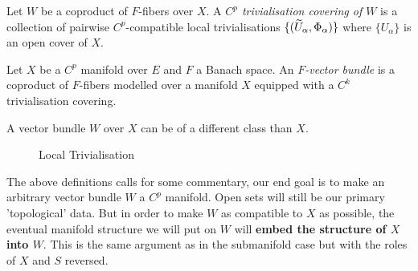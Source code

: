 \documentclass[../main-manifolds.tex]{subfiles}
\begin{document}
%
%
\begin{definition}\label{def:trivialisation-covering}
    Let $W$ be a coproduct of $F$-fibers over $X$. A \emph{$C^p$ trivialisation covering of $W$} is a collection of pairwise $C^p$-compatible local trivialisations $\{(\widetilde{U}_{\alpha},\Phi_{\alpha})\}$ where $\{U_\alpha\}$ is an open cover of $X$.
\end{definition}
\begin{definition}\label{def:vector-bundle}
    Let $X$ be a $C^p$ manifold over $E$ and $F$ a Banach space. An \emph{$F$-vector bundle} is a coproduct of $F$-fibers modelled over a manifold $X$ equipped with a $C^k$ trivialisation covering.
\end{definition}
\begin{remark}[k vs. p]
    A vector bundle $W$ over $X$ can be of a different class than $X$.
\end{remark} 
    \begin{figure}
\centering
{}
\caption{Local Trivialisation}
\label{fig:local-trivialisation}
\end{figure}
The above definitions calls for some commentary, our end goal is to make an arbitrary vector bundle $W$ a $C^p$ manifold. Open sets will still be our primary 'topological' data. But in order to make $W$ as compatible to $X$ as possible, the eventual manifold structure we will put on $W$ will \textbf{embed the structure of $X$ into $W$}. This is the same argument as in the submanifold case but with the roles of $X$ and $S$ reversed.\\
\end{document}

